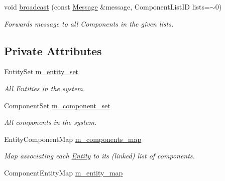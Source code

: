 \begin{DoxyCompactItemize}
\mbox{\label{classnta_1_1ECS_a19f1071b0747522e3c82fcdc61d060bb}} 
void \hyperlink{classnta_1_1ECS_a19f1071b0747522e3c82fcdc61d060bb}{broadcast} (const \hyperlink{structnta_1_1Message}{Message} \&message, Component\+List\+ID lists=$\sim$0)
\begin{DoxyCompactList}\small\item\em Forwards message to all Components in the given lists. \end{DoxyCompactList}\end{DoxyCompactItemize}
\subsection*{Private Attributes}
\begin{DoxyCompactItemize}
\item 
\mbox{\label{classnta_1_1ECS_abd914b89f79ea39e02d410e9d709a845}} 
Entity\+Set \hyperlink{classnta_1_1ECS_abd914b89f79ea39e02d410e9d709a845}{m\+\_\+entity\+\_\+set}
\begin{DoxyCompactList}\small\item\em All Entities in the system. \end{DoxyCompactList}\item 
\mbox{\label{classnta_1_1ECS_a977c7be937b70dd273153b67a1faf9a5}} 
Component\+Set \hyperlink{classnta_1_1ECS_a977c7be937b70dd273153b67a1faf9a5}{m\+\_\+component\+\_\+set}
\begin{DoxyCompactList}\small\item\em All components in the system. \end{DoxyCompactList}\item 
\mbox{\label{classnta_1_1ECS_aa7069093670285de8ae96f5a8f6e7272}} 
Entity\+Component\+Map \hyperlink{classnta_1_1ECS_aa7069093670285de8ae96f5a8f6e7272}{m\+\_\+components\+\_\+map}
\begin{DoxyCompactList}\small\item\em Map associating each \hyperlink{classnta_1_1Entity}{Entity} to its (linked) list of components. \end{DoxyCompactList}\item 
\mbox{\label{classnta_1_1ECS_ab5c3a72aaaa0d6afef6f7bd7a0ee9c02}} 
Component\+Entity\+Map \hyperlink{classnta_1_1ECS_ab5c3a72aaaa0d6afef6f7bd7a0ee9c02}{m\+\_\+entity\+\_\+map}

\end{DoxyCompactItemize}
